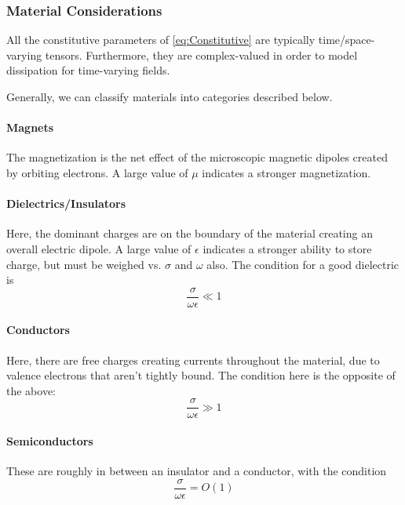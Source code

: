 \documentclass{article}
\numberwithin{equation}{section}
\begin{document}
        \subsubsection{Material Considerations}
            All the constitutive parameters of \eqref{eq:Constitutive} are typically
            time/space-varying tensors. Furthermore, they are complex-valued in order to
            model dissipation for time-varying fields.

            Generally, we can classify materials into categories described below.
        \paragraph{Magnets}
            The magnetization is the net effect of the microscopic
            magnetic dipoles created by orbiting electrons. A large value of $\mu$
            indicates a stronger magnetization.

        \paragraph{Dielectrics/Insulators}
            Here, the dominant charges are on the boundary of the material creating an
            overall electric dipole. A large value of $\epsilon$ indicates a stronger
            ability to store charge, but must be weighed vs. $\sigma$ and $\omega$ also.
            The condition for a good dielectric is
            \begin{equation} 
                \frac{\sigma}{\omega \epsilon} \ll 1
            \end{equation}

        \paragraph{Conductors}
            Here, there are free charges creating currents throughout the material, due to
            valence electrons that aren't tightly bound. The condition here is the
            opposite of the above:
            \begin{equation} \label{eq:conductor}
                \frac{\sigma}{\omega \epsilon} \gg 1
            \end{equation}

        \paragraph{Semiconductors}
            These are roughly in between an insulator and a conductor, with the condition
                \begin{equation} \label{eq:semiconductor}
                    \frac{\sigma}{\omega \epsilon} = O(1)
                \end{equation}
        \newpage
\end{document}
